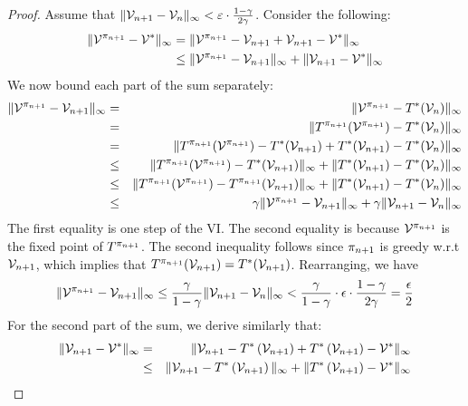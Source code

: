 \begin{proof}
Assume that $\|\mathcal{V}_{n+1}-\mathcal{V}_{n}\|_\infty < \varepsilon \cdot
\frac{1-\gamma}{2\gamma}$. Consider the following:
\begin{align}
\|\mathcal{V}^{\pi_{n+1}}-\mathcal{V}^{*}\|_\infty & =\|\mathcal{V}^{\pi_{n+1}} - \mathcal{V}_{n+1} + \mathcal{V}_{n+1} -\mathcal{V}^{*}\|_\infty \nonumber\\
 & \leq\|\mathcal{V}^{\pi_{n+1}}-\mathcal{V}_{n+1}\|_\infty+\|\mathcal{V}_{n+1}-\mathcal{V}^{*}\|_\infty\label{L6:epopeq}
\end{align}
We now bound each part of the sum separately:
\begin{eqnarray*}
\|\mathcal{V}^{\pi_{n+1}} - \mathcal{V}_{n+1}\|_\infty & = &
\|\mathcal{V}^{\pi_{n+1}} - T^*(\mathcal{V}_{n})\|_\infty\\ & = &
\|T^{\pi_{n+1}}(\mathcal{V}^{\pi_{n+1}}) - T^*(\mathcal{V}_{n})\|_\infty\\
& = & \|T^{\pi_{n+1}}(\mathcal{V}^{\pi_{n+1}}) -
T^*(\mathcal{V}_{n+1}) + T^*(\mathcal{V}_{n+1}) - T^*(\mathcal{V}_{n})\|_\infty\\
& \leq & \|T^{\pi_{n+1}}(\mathcal{V}^{\pi_{n+1}}) -
T^*(\mathcal{V}_{n+1})\|_\infty + \|T^*(\mathcal{V}_{n+1}) - T^*(\mathcal{V}_{n})\|_\infty\\
& \leq & \|T^{\pi_{n+1}}(\mathcal{V}^{\pi_{n+1}}) -
T^{\pi_{n+1}}(\mathcal{V}_{n+1})\|_\infty + \|T^*(\mathcal{V}_{n+1}) - T^*(\mathcal{V}_{n})\|_\infty\\
& \leq & \gamma\|\mathcal{V}^{\pi_{n+1}} - \mathcal{V}_{n+1}\|_\infty +
\gamma\|\mathcal{V}_{n+1} - \mathcal{V}_{n}\|_\infty
\end{eqnarray*}
The first equality is one step of the VI.
The second equality is because $\mathcal{V}^{\pi_{n+1}}$ 
is the fixed point of $T^{\pi_{n+1}}$. The second inequality
follows since $\pi_{n+1}$ is greedy w.r.t $\mathcal{V}_{n+1}$,
which implies that $T^{\pi_{n+1}}(\mathcal{V}_{n+1}) =
T^*(\mathcal{V}_{n+1})$. Rearranging, we have
\begin{eqnarray*} \|\mathcal{V}^{\pi_{n+1}} -
\mathcal{V}_{n+1}\|_\infty \leq \frac{\gamma}{1-\gamma}\|\mathcal{V}_{n+1} -
\mathcal{V}_{n}\|_\infty < \frac{\gamma}{1-\gamma} \cdot \epsilon \cdot
\frac{1-\gamma}{2\gamma} =\frac{\epsilon}{2}
\end{eqnarray*}
For the second part of the sum, we derive similarly that:
\begin{eqnarray*}
\|\Value_{n+1}-\Value^{*}\|_{\infty} & = & \|\Value_{n+1}-T^{*}\left(\Value_{n+1}\right)+T^{*}\left(\Value_{n+1}\right)-\Value^{*}\|_{\infty}\\
 & \leq & \|\Value_{n+1}-T^{*}\left(\Value_{n+1}\right)\|_{\infty}+\|T^{*}\left(\Value_{n+1}\right)-\Value^{*}\|_{\infty}\\

\end{eqnarray*}
\end{proof}
